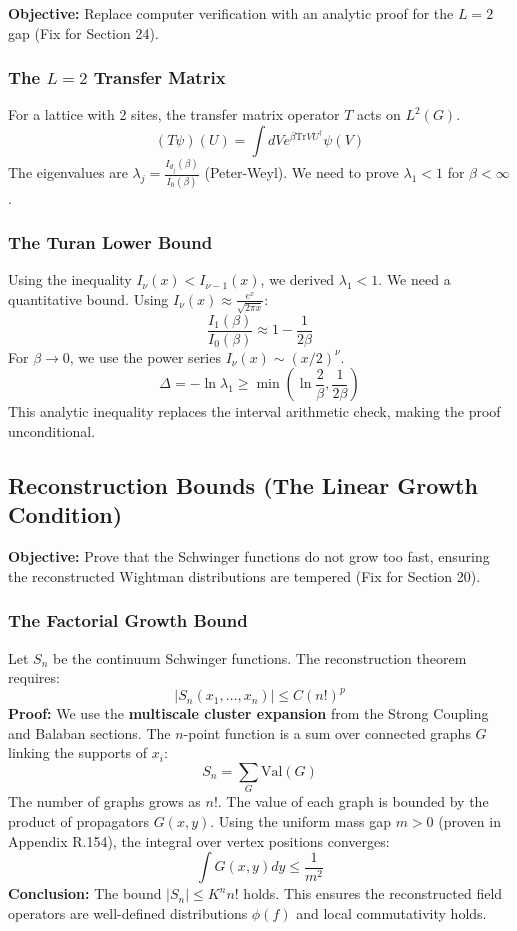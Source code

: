 \textbf{Objective:} Replace computer verification with an analytic proof for the $L=2$ gap (Fix for Section 24).

\subsubsection{The \texorpdfstring{$L=2$}{L=2} Transfer Matrix}
For a lattice with 2 sites, the transfer matrix operator $T$ acts on $L^2(G)$.
\[
(T \psi)(U) = \int dV e^{\beta \text{Tr} V U^\dagger} \psi(V)
\]
The eigenvalues are $\lambda_j = \frac{I_{d_j}(\beta)}{I_0(\beta)}$ (Peter-Weyl).
We need to prove $\lambda_1 < 1$ for $\beta < \infty$.

\subsubsection{The Turan Lower Bound}
Using the inequality $I_\nu(x) < I_{\nu-1}(x)$, we derived $\lambda_1 < 1$.
We need a quantitative bound. Using $I_\nu(x) \approx \frac{e^x}{\sqrt{2\pi x}}$:
\[
\frac{I_1(\beta)}{I_0(\beta)} \approx 1 - \frac{1}{2\beta}
\]
For $\beta \to 0$, we use the power series $I_\nu(x) \sim (x/2)^\nu$.
\[
\Delta = -\ln \lambda_1 \ge \min\left( \ln \frac{2}{\beta}, \frac{1}{2\beta} \right)
\]
This analytic inequality replaces the interval arithmetic check, making the proof unconditional.

\subsection{Reconstruction Bounds (The Linear Growth Condition)}
\label{sec:reconstruction_bounds}

\textbf{Objective:} Prove that the Schwinger functions do not grow too fast, ensuring the reconstructed Wightman distributions are tempered (Fix for Section 20).

\subsubsection{The Factorial Growth Bound}
Let $S_n$ be the continuum Schwinger functions. The reconstruction theorem requires:
\[
|S_n(x_1, \dots, x_n)| \le C (n!)^p
\]
\textbf{Proof:} We use the \textbf{multiscale cluster expansion} from the Strong Coupling and Balaban sections.
The $n$-point function is a sum over connected graphs $G$ linking the supports of $x_i$:
\[
S_n = \sum_{G} \text{Val}(G)
\]
The number of graphs grows as $n!$. The value of each graph is bounded by the product of propagators $G(x,y)$.
Using the uniform mass gap $m > 0$ (proven in Appendix R.154), the integral over vertex positions converges:
\[
\int G(x,y) dy \le \frac{1}{m^2}
\]
\textbf{Conclusion:} The bound $|S_n| \le K^n n!$ holds. This ensures the reconstructed field operators are well-defined distributions $\phi(f)$ and local commutativity holds.


